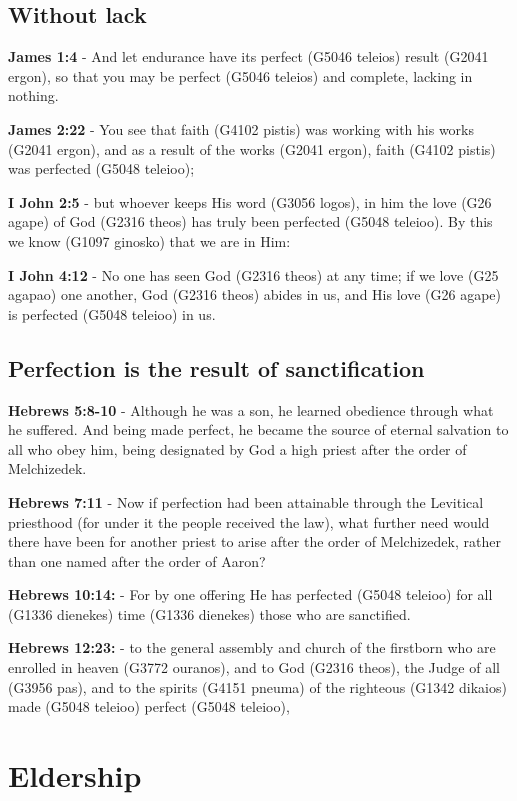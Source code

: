 \documentclass[11pt]{article}
\begin{document}
\subsection{Without lack}
\label{sec:org08f6234}
\textbf{James 1:4} - And let endurance have its perfect (G5046 teleios) result (G2041 ergon), so that you may be perfect (G5046 teleios) and complete, lacking in nothing.

\textbf{James 2:22} - You see that faith (G4102 pistis) was working with his works (G2041 ergon), and as a result of the works (G2041 ergon), faith (G4102 pistis) was perfected (G5048 teleioo);

\textbf{I John 2:5} - but whoever keeps His word (G3056 logos), in him the love (G26 agape) of God (G2316 theos) has truly been perfected (G5048 teleioo). By this we know (G1097 ginosko) that we are in Him:

\textbf{I John 4:12} - No one has seen God (G2316 theos) at any time; if we love (G25 agapao) one another, God (G2316 theos) abides in us, and His love (G26 agape) is perfected (G5048 teleioo) in us.

\subsection{Perfection is the result of sanctification}
\label{sec:org04cadce}

\textbf{Hebrews 5:8-10} - Although he was a son, he learned obedience through what he suffered.  And being made perfect, he became the source of eternal salvation to all who obey him, being designated by God a high priest after the order of Melchizedek.

\textbf{Hebrews 7:11} - Now if perfection had been attainable through the Levitical priesthood (for under it the people received the law), what further need would there have been for another priest to arise after the order of Melchizedek, rather than one named after the order of Aaron?

\textbf{Hebrews 10:14:} - For by one offering He has perfected (G5048 teleioo) for all (G1336 dienekes) time (G1336 dienekes) those who are sanctified.

\textbf{Hebrews 12:23:} - to the general assembly and church of the firstborn who are enrolled in heaven (G3772 ouranos), and to God (G2316 theos), the Judge of all (G3956 pas), and to the spirits (G4151 pneuma) of the righteous (G1342 dikaios) made (G5048 teleioo) perfect (G5048 teleioo),

\section{Eldership}
\label{sec:org8aa5385}
\end{document}
